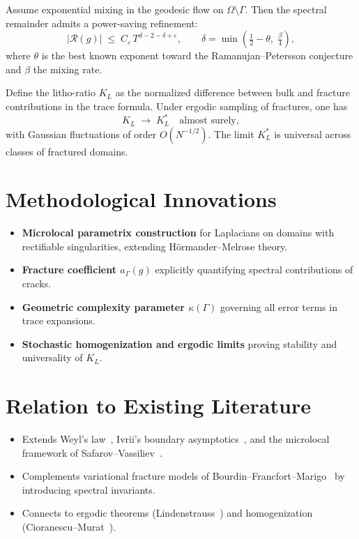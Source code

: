 \begin{theorem}
Assume exponential mixing in the geodesic flow on $\Omega\setminus\Gamma$. 
Then the spectral remainder admits a power-saving refinement:
\[
    |\mathcal{R}(g)| \;\leq\; C_\varepsilon\, T^{d-2-\delta+\varepsilon},
    \qquad 
    \delta = \min\!\left(\tfrac{1}{2}-\theta,\;\tfrac{\beta}{4}\right),
\]
where $\theta$ is the best known exponent toward the Ramanujan--Petersson 
conjecture and $\beta$ the mixing rate.
\end{theorem}

\begin{theorem}
Define the litho-ratio $K_L$ as the normalized difference between bulk and 
fracture contributions in the trace formula. Under ergodic sampling of 
fractures, one has
\[
    K_L \;\to\; K_L^* 
    \quad\text{almost surely},
\]
with Gaussian fluctuations of order $O(N^{-1/2})$. 
The limit $K_L^*$ is universal across classes of fractured domains.
\end{theorem}

\section*{Methodological Innovations}

\begin{itemize}
    \item \textbf{Microlocal parametrix construction} for Laplacians on domains 
    with rectifiable singularities, extending Hörmander--Melrose theory.
    \item \textbf{Fracture coefficient $a_\Gamma(g)$} explicitly quantifying 
    spectral contributions of cracks.
    \item \textbf{Geometric complexity parameter $\kappa(\Gamma)$} 
    governing all error terms in trace expansions.
    \item \textbf{Stochastic homogenization and ergodic limits} 
    proving stability and universality of $K_L$.
\end{itemize}

\section*{Relation to Existing Literature}

\begin{itemize}
    \item Extends Weyl’s law~\cite{Weyl1911}, Ivrii’s boundary 
    asymptotics~\cite{Ivrii1980}, and the microlocal framework of 
    Safarov--Vassiliev~\cite{SafarovVassiliev1997}.
    \item Complements variational fracture models of 
    Bourdin--Francfort--Marigo~\cite{BourdinFrancfortMarigo2008} 
    by introducing spectral invariants.
    \item Connects to ergodic theorems (Lindenstrauss~\cite{Lindenstrauss2001}) 
    and homogenization (Cioranescu--Murat~\cite{CioranescuMurat1997}).
\end{itemize}

